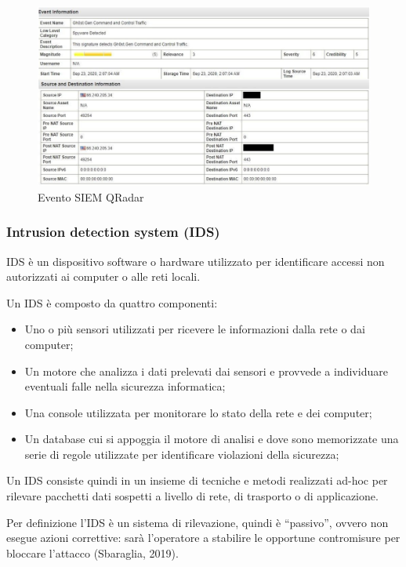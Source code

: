 \begin{figure}[h]
\begin{center}
\includegraphics[width=0.95\columnwidth]{images/2_architettura_img/QRadarEvent.png}
\end{center}
\caption{Evento SIEM QRadar}
\label{fig:Evento SIEM QRadar}
\end{figure}

\subsubsection{Intrusion detection system (IDS) }

IDS è un dispositivo software o hardware utilizzato per identificare accessi non autorizzati ai computer o alle reti locali. \par
Un IDS è composto da quattro componenti:
\begin{itemize}
    \item Uno o più sensori utilizzati per ricevere le informazioni dalla rete o dai computer;
    \item Un motore che analizza i dati prelevati dai sensori e provvede a individuare eventuali falle nella sicurezza informatica;
    \item Una console utilizzata per monitorare lo stato della rete e dei computer;
    \item Un database cui si appoggia il motore di analisi e dove sono memorizzate una serie di regole utilizzate per identificare violazioni della sicurezza;

\end{itemize}

Un IDS consiste quindi in un insieme di tecniche e metodi realizzati ad-hoc per rilevare pacchetti dati sospetti a livello di rete, di trasporto o di applicazione.\par
Per definizione l’IDS è un sistema di rilevazione, quindi è “passivo”, ovvero non esegue azioni correttive: sarà l’operatore a stabilire le opportune contromisure per bloccare l’attacco (Sbaraglia, 2019).\newpage

